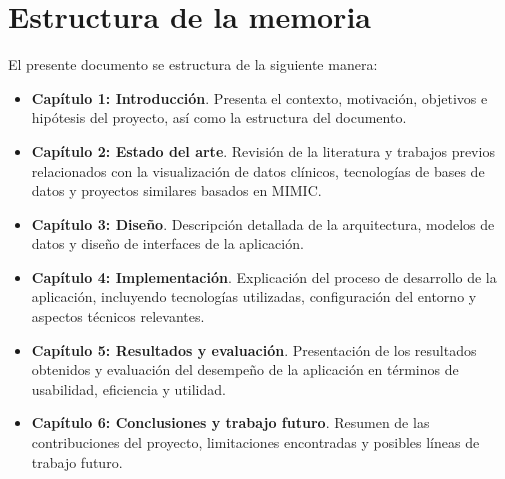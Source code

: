 \section{Estructura de la memoria}

El presente documento se estructura de la siguiente manera:

\begin{itemize}
    \item \textbf{Capítulo 1: Introducción}. Presenta el contexto, motivación, objetivos e hipótesis del proyecto, así como la estructura del documento.
    
    \item \textbf{Capítulo 2: Estado del arte}. Revisión de la literatura y trabajos previos relacionados con la visualización de datos clínicos, tecnologías de bases de datos y proyectos similares basados en MIMIC.
    
    \item \textbf{Capítulo 3: Diseño}. Descripción detallada de la arquitectura, modelos de datos y diseño de interfaces de la aplicación.
    
    \item \textbf{Capítulo 4: Implementación}. Explicación del proceso de desarrollo de la aplicación, incluyendo tecnologías utilizadas, configuración del entorno y aspectos técnicos relevantes.
    
    \item \textbf{Capítulo 5: Resultados y evaluación}. Presentación de los resultados obtenidos y evaluación del desempeño de la aplicación en términos de usabilidad, eficiencia y utilidad.
    
    \item \textbf{Capítulo 6: Conclusiones y trabajo futuro}. Resumen de las contribuciones del proyecto, limitaciones encontradas y posibles líneas de trabajo futuro.
\end{itemize}
